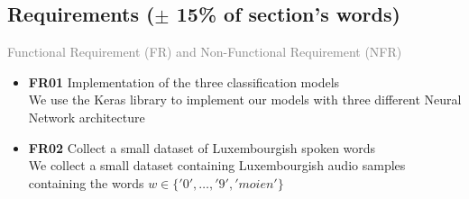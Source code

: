 \subsection{Requirements ($\pm$ 15\% of section's words)}

\textcolor{gray}{Functional Requirement (FR) and Non-Functional Requirement
  (NFR)}


\begin{itemize}
  \item \textbf{FR01} Implementation of the three classification models\\
    We use the Keras library to implement our models with three
    different Neural Network architecture
  \item \textbf{FR02} Collect a small dataset of Luxembourgish spoken words\\
    We collect a small dataset containing Luxembourgish audio samples containing
    the words $w \in \{'0',\dots,'9','moien'\}$
\end{itemize}
